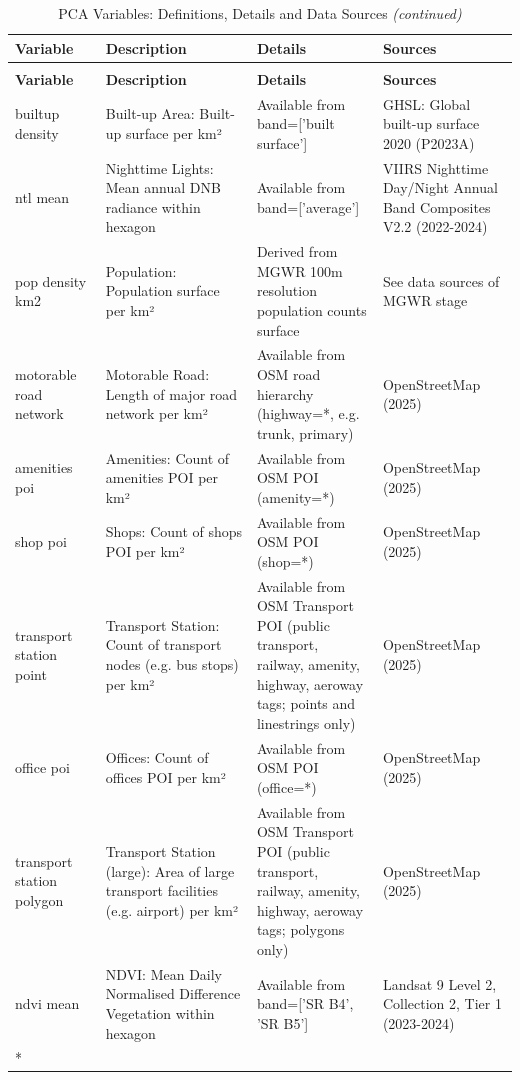 \documentclass[
  12pt,
  oneside]{book}
\begin{document}
\setlength{\tabcolsep}{4pt}

\begingroup\fontsize{8.8}{10.8}\selectfont

\begin{longtable}[t]{p{0.18\linewidth}p{0.30\linewidth}p{0.25\linewidth}p{0.27\linewidth}}
\caption{\label{tab:pca-variables}PCA Variables: Definitions, Details and Data Sources}\\
\toprule
\textbf{Variable} & \textbf{Description} & \textbf{Details} & \textbf{Sources}\\
\midrule
\endfirsthead
\caption[]{\label{tab:pca-variables}PCA Variables: Definitions, Details and Data Sources \textit{(continued)}}\\
\toprule
\textbf{Variable} & \textbf{Description} & \textbf{Details} & \textbf{Sources}\\
\midrule
\endhead

\endfoot
\bottomrule
\endlastfoot
builtup density & Built-up Area: Built-up surface per km² & Available from band=['built surface'] & GHSL: Global built-up surface 2020 (P2023A)\\
ntl mean & Nighttime Lights: Mean annual DNB radiance within hexagon & Available from band=['average'] & VIIRS Nighttime Day/Night Annual Band Composites V2.2 (2022-2024)\\
pop density km2 & Population: Population surface per km² & Derived from MGWR 100m resolution population counts surface & See data sources of MGWR stage\\
motorable road network & Motorable Road: Length of major road network per km² & Available from OSM road hierarchy (highway=*, e.g. trunk, primary) & OpenStreetMap (2025)\\
amenities poi & Amenities: Count of amenities POI per km² & Available from OSM POI (amenity=*) & OpenStreetMap (2025)\\
\addlinespace
shop poi & Shops: Count of shops POI per km² & Available from OSM POI (shop=*) & OpenStreetMap (2025)\\
transport station point & Transport Station: Count of transport nodes (e.g. bus stops) per km² & Available from OSM Transport POI (public transport, railway, amenity, highway, aeroway tags; points and linestrings only) & OpenStreetMap (2025)\\
office poi & Offices: Count of offices POI per km² & Available from OSM POI (office=*) & OpenStreetMap (2025)\\
transport station polygon & Transport Station (large): Area of large transport facilities (e.g. airport) per km² & Available from OSM Transport POI (public transport, railway, amenity, highway, aeroway tags; polygons only) & OpenStreetMap (2025)\\
ndvi mean & NDVI: Mean Daily Normalised Difference Vegetation within hexagon & Available from band=['SR B4', 'SR B5'] & Landsat 9 Level 2, Collection 2, Tier 1 (2023-2024)\\*
\end{longtable}
\endgroup{}
\end{document}
